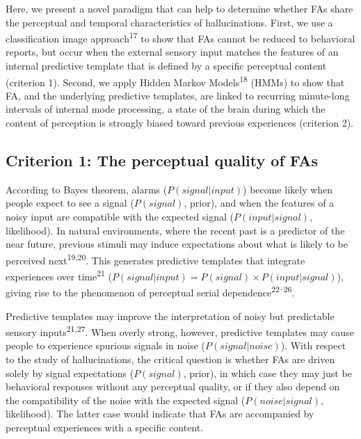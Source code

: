 \documentclass[
]{article}
\begin{document}
Here, we present a novel paradigm that can help to determine whether FAs
share the perceptual and temporal characteristics of hallucinations.
First, we use a classification image approach\textsuperscript{17} to
show that FAs cannot be reduced to behavioral reports, but occur when
the external sensory input matches the features of an internal
predictive template that is defined by a specific perceptual content
(criterion 1). Second, we apply Hidden Markov Models\textsuperscript{18}
(HMMs) to show that FA, and the underlying predictive templates, are
linked to recurring minute-long intervals of internal mode processing, a
state of the brain during which the content of perception is strongly
biased toward previous experiences (criterion 2).

\hypertarget{criterion-1-the-perceptual-quality-of-fas}{%
\subsection{Criterion 1: The perceptual quality of
FAs}\label{criterion-1-the-perceptual-quality-of-fas}}

According to Bayes theorem, alarms (\(P(signal|input)\)) become likely
when people expect to see a signal (\(P(signal)\), prior), and when the
features of a noisy input are compatible with the expected signal
(\(P(input|signal)\), likelihood). In natural environments, where the
recent past is a predictor of the near future, previous stimuli may
induce expectations about what is likely to be perceived
next\textsuperscript{19,20}. This generates predictive templates that
integrate experiences over time\textsuperscript{21}
(\(P(signal|input) = P(signal) \times P(input|signal)\)), giving rise to
the phenomenon of perceptual serial dependence\textsuperscript{22--26}.

Predictive templates may improve the interpretation of noisy but
predictable sensory inputs\textsuperscript{21,27}. When overly strong,
however, predictive templates may cause people to experience spurious
signals in noise (\(P(signal|noise)\)). With respect to the study of
hallucinations, the critical question is whether FAs are driven solely
by signal expectations (\(P(signal)\), prior), in which case they may
just be behavioral responses without any perceptual quality, or if they
also depend on the compatibility of the noise with the expected signal
(\(P(noise|signal)\), likelihood). The latter case would indicate that
FAs are accompanied by perceptual experiences with a specific content.
\end{document}
